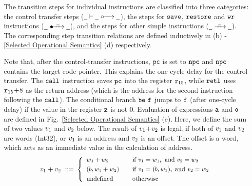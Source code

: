 %				
%				
%				
%				

The transition steps for individual instructions are classified into
three categories: the control transfer steps
(${\underline{\ \,}} \vdash {\underline{\ \,}} \ \circ\mkern-7mu\xrightarrow{\quad} {\underline{\ \,}}$),
the steps for
$\texttt{save}$, $\texttt{restore}$ and $\texttt{wr}$ instructions
($\swtrans{\notCare}{\ \notCare\ }{\notCare}$),
and the steps
for other simple instructions
(${\underline{\ \,}} \xrightarrow{{\ \underline{\ \,}\ }} {\underline{\ \,}}$). The
corresponding step transition relations are defined inductively
in \Fig{\ref{Selected Operational Semantics}}
(b) - \ref{Selected Operational Semantics} (d)
respectively.

Note that, after the control-transfer instructions, $\texttt{pc}$ is set
to $\texttt{npc}$ and $\texttt{npc}$ contains the target code pointer. This explains
the one cycle delay for the control transfer.
The $\texttt{call}$ instruction saves $\texttt{pc}$ into the register $\texttt{r}_{15}$,
while $\texttt{retl}$ uses $\texttt{r}_{15} \!+\! 8$ as the
return address (which is the address for the second instruction
following the $\texttt{call}$).
The conditional branch $\texttt{be}{} \ \texttt{f}_{}$ jumps to $\texttt{f}_{}$ 
(after one-cycle delay) if 
the value in the register $\texttt{z}$ is not 0.
Evaluation of
expressions $\texttt{a}$ and $\texttt{o}$ are defined
in Fig.~\ref{Selected Operational Semantics} (e).
Here, we define the sum of two values $v_1$
and $v_2$ below. The result of $v_1\!+\!v_2$
is legal, if both of $v_1$ and $v_2$
are words (Int32), or $v_1$ is an address and
$v_2$ is an offset. The offset is a word,
which acts as an immediate value in the
calculation of address.
\[
	\small
	v_1 + v_2 \ ::\!\!{=} \
	\left\{
		\begin{array}{ll}
			w_1 + w_2 & \quad \text{if} \
				v_1 = w_1, \text{ and }
				v_2 = w_2 \\
			\\[-8pt]
			(b, w_1 + w_2) & \quad
				\text{if} \
				v_1 = (b, w_1),
				\text{ and }
				v_2 = w_2 \\
			\\[-8pt]
			\text{undefined} & \quad \text{otherwise}
		\end{array}
	\right.
\]

